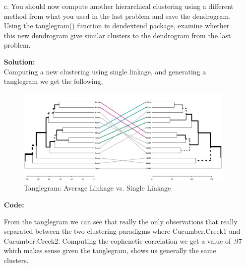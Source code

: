 \documentclass[12pt]{article}
\makeatletter
\theoremstyle{homework}
\newenvironment{exercise}[1]
{\def\@currentlabel{#1}\exercisecore}
{\endexercisecore}
\newcommand{\localhead}[1]{\par\smallskip\noindent\textbf{#1}\nobreak\\}%
\newcommand\solution{\localhead{Solution:}}
\makeatother
\begin{document}
\begin{exercise}{3}
\begin{enumerate}
    \item[c.] You should now compute another hierarchical clustering using a different method from what you used in the 
    last problem and save the dendrogram. Using the tanglegram() function in dendextend package, examine whether this new dendrogram give similar clusters to the 
    dendrogram from the last problem.\\ 
    \solution Computing a new clustering using single linkage, and generating a tanglegram we get the following, 
    \begin{figure}[H]
      \begin{center}
        \caption{Tanglegram: Average Linkage vs. Single Linkage}
      \includegraphics[width = \textwidth]{Rplot10.png}
      \end{center}
  \end{figure}
  \textbf{Code:}
  \begin{center}
  
  \end{center}
  From the tanglegram we can see that really the only observations that really separated between the two 
  clustering paradigms where Cucumber.Creek1 and Cucumber.Creek2. Computing the cophenetic correlation we get a value of .97 which makes 
  sense given the tanglegram, shows us generally the same clusters. 
  \end{enumerate}
\end{exercise}
\vspace{.5in}
\end{document}
